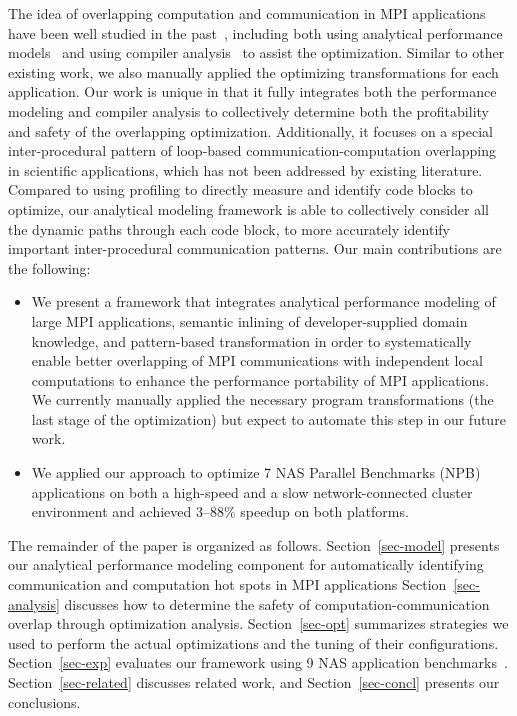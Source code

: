The idea of overlapping computation and communication in MPI applications have been
well studied in the past~\cite{danalis:sc05,fishgold:ipdps06}, including both using analytical performance
models~\cite{iancu:ppopp07}
and using compiler analysis~\cite{danalis:ics09} to assist the optimization.
Similar to other existing work, we also manually applied the optimizing transformations for each application.
Our work is unique in that it fully integrates both the performance modeling and compiler analysis to collectively
determine both the profitability and safety of the overlapping optimization.
Additionally, it
focuses on a special inter-procedural pattern of loop-based
communication-computation overlapping in scientific applications, which has not been addressed
by existing literature. 
Compared to using profiling to directly measure and identify code blocks to optimize, 
 our analytical modeling framework is able to collectively consider all the dynamic paths through each code block,
to more accurately identify important inter-procedural communication patterns.
Our main contributions are the following:

\begin{itemize}

\item We present a framework that integrates analytical performance
  modeling of large MPI applications, semantic inlining of
  developer-supplied domain knowledge, and pattern-based
  transformation in order to systematically enable better overlapping
  of MPI communications with independent local computations to enhance
  the performance portability of MPI applications. We currently
  manually applied the necessary program transformations (the last
  stage of the optimization) but expect to automate this step in our
  future work.

\item We applied our approach to optimize 7 NAS Parallel Benchmarks
  (NPB) applications on both a high-speed and a slow network-connected
  cluster environment and achieved 3--88\% speedup on both platforms.

\end{itemize}


The remainder of the paper is organized as follows.
Section~\ref{sec-model} presents our analytical performance modeling
component for automatically identifying communication and computation
hot spots in MPI applications Section~\ref{sec-analysis} discusses how
to determine the safety of computation-communication overlap through
optimization analysis.  Section~\ref{sec-opt} summarizes strategies we
used to perform the actual optimizations and the tuning of their
configurations.  Section~\ref{sec-exp} evaluates our framework using 9
NAS application benchmarks~\cite{npb}.  Section~\ref{sec-related}
discusses related work, and Section~\ref{sec-concl} presents our
conclusions.
